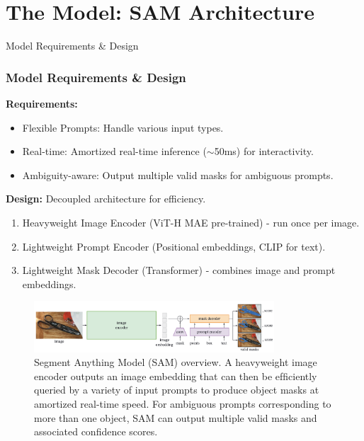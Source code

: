 \documentclass{beamer}
\begin{document}
\section{The Model: SAM Architecture}

\begin{frame}{Model Requirements & Design}
    \frametitle{Model Requirements \& Design}
    \textbf{Requirements:}
    \begin{itemize}
        \item Flexible Prompts: Handle various input types.
        \item Real-time: Amortized real-time inference ($\sim$50ms) for interactivity.
        \item Ambiguity-aware: Output multiple valid masks for ambiguous prompts.
    \end{itemize}
    \textbf{Design:} Decoupled architecture for efficiency.
    \begin{enumerate}
        \item Heavyweight Image Encoder (ViT-H MAE pre-trained) - run once per image.
        \item Lightweight Prompt Encoder (Positional embeddings, CLIP for text).
        \item Lightweight Mask Decoder (Transformer) - combines image and prompt embeddings.
    \end{enumerate}
    \vfill
    \begin{figure}
        \centering
        \includegraphics[width=0.8\textwidth]{figures/SAM_overview.png}
        \caption{\tiny Segment Anything Model (SAM) overview. A heavyweight image encoder outputs an image embedding that can
        then be efﬁciently queried by a variety of input prompts to produce object masks at amortized real-time speed. For ambiguous
        prompts corresponding to more than one object, SAM can output multiple valid masks and associated conﬁdence scores.}
        \label{fig:sam_architecture}
    \end{figure}
\end{frame}
\end{document}
